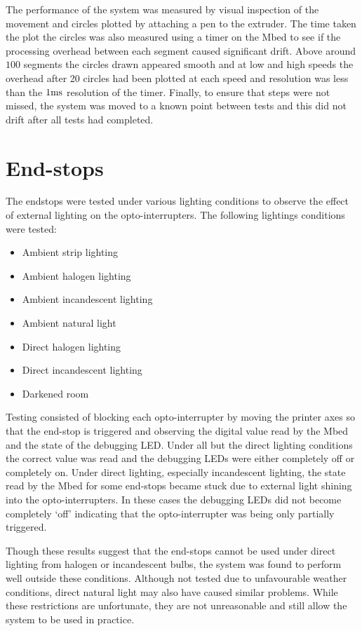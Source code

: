 			The performance of the system was measured by visual inspection of the
			movement and circles plotted by attaching a pen to the extruder. The time
			taken the plot the circles was also measured using a timer on the Mbed to
			see if the processing overhead between each segment caused significant
			drift. Above around $100$ segments the circles drawn appeared smooth and
			at low and high speeds the overhead after 20 circles had been plotted at
			each speed and resolution was less than the $1\textrm{ms}$ resolution of the
			timer. Finally, to ensure that steps were not missed, the system was moved
			to a known point between tests and this did not drift after all tests had
			completed.
	
	\section{End-stops}
		
		The endstops were tested under various lighting conditions to observe the
		effect of external lighting on the opto-interrupters. The following
		lightings conditions were tested:
		\begin{itemize}
			\item Ambient strip lighting
			\item Ambient halogen lighting
			\item Ambient incandescent lighting
			\item Ambient natural light
			\item Direct halogen lighting
			\item Direct incandescent lighting
			\item Darkened room
		\end{itemize}
		
		Testing consisted of blocking each opto-interrupter by moving the printer
		axes so that the end-stop is triggered and observing the digital value read
		by the Mbed and the state of the debugging LED. Under all but the direct
		lighting conditions the correct value was read and the debugging LEDs were
		either completely off or completely on. Under direct lighting, especially
		incandescent lighting, the state read by the Mbed for some end-stops became
		stuck due to external light shining into the opto-interrupters. In these cases
		the debugging LEDs did not become completely `off' indicating that the
		opto-interrupter was being only partially triggered.
		
		Though these results suggest that the end-stops cannot be used under direct
		lighting from halogen or incandescent bulbs, the system was found to perform
		well outside these conditions. Although not tested due to unfavourable
		weather conditions, direct natural light may also have caused similar
		problems. While these restrictions are unfortunate, they are not
		unreasonable and still allow the system to be used in practice.
	
